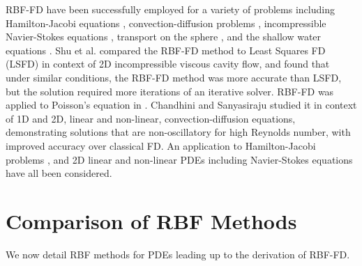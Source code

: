 \documentclass{report}
\begin{document}
{RBF-FD have been successfully employed for a variety of problems including Hamilton-Jacobi equations \cite{Cecil2004}, convection-diffusion problems \cite{Chandhini2007, Stevens2009b},
incompressible Navier-Stokes equations \cite{Shu2003,Chinchapatnam2009}, transport on the sphere \cite{FornbergLehto11}, and the shallow water equations \cite{FlyerLehto11}.
Shu et al. \cite{Shu2006} compared the RBF-FD method to Least Squares FD (LSFD) in context of 2D incompressible viscous 
cavity flow, and found that under similar conditions, the RBF-FD method was more accurate than LSFD, but the solution required 
more iterations of an iterative solver. RBF-FD was applied to Poisson's 
equation in \cite{Wright2004}.  Chandhini and Sanyasiraju \cite{Chandhini2007} studied it in context of 1D and 2D, 
linear and non-linear, 
convection-diffusion equations, demonstrating solutions that are non-oscillatory for high Reynolds number, with improved 
accuracy over classical FD. An application to Hamilton-Jacobi problems \cite{Cecil2004}, and 2D linear and non-linear PDEs 
including Navier-Stokes equations \cite{Shu2003} have all been considered. 



%




\section{Comparison of RBF Methods}

We now detail RBF methods for PDEs leading up to the derivation of RBF-FD. 

}
\end{document}

